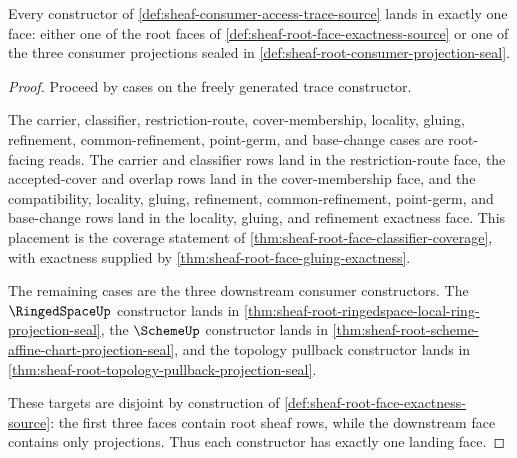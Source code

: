 \begin{theorem}
\label{thm:sheaf-consumer-access-trace-face-coverage}
Every constructor of \autoref{def:sheaf-consumer-access-trace-source} lands in exactly one face: either one of the root faces of \autoref{def:sheaf-root-face-exactness-source} or one of the three consumer projections sealed in \autoref{def:sheaf-root-consumer-projection-seal}.
\end{theorem}
\begin{proof}
Proceed by cases on the freely generated trace constructor.

The carrier, classifier, restriction-route, cover-membership, locality, gluing, refinement, common-refinement, point-germ, and base-change cases are root-facing reads. The carrier and classifier rows land in the restriction-route face, the accepted-cover and overlap rows land in the cover-membership face, and the compatibility, locality, gluing, refinement, common-refinement, point-germ, and base-change rows land in the locality, gluing, and refinement exactness face. This placement is the coverage statement of \autoref{thm:sheaf-root-face-classifier-coverage}, with exactness supplied by \autoref{thm:sheaf-root-face-gluing-exactness}.

The remaining cases are the three downstream consumer constructors. The $\RingedSpaceUp$ constructor lands in \autoref{thm:sheaf-root-ringedspace-local-ring-projection-seal}, the $\SchemeUp$ constructor lands in \autoref{thm:sheaf-root-scheme-affine-chart-projection-seal}, and the topology pullback constructor lands in \autoref{thm:sheaf-root-topology-pullback-projection-seal}.

These targets are disjoint by construction of \autoref{def:sheaf-root-face-exactness-source}: the first three faces contain root sheaf rows, while the downstream face contains only projections. Thus each constructor has exactly one landing face.
\end{proof}

